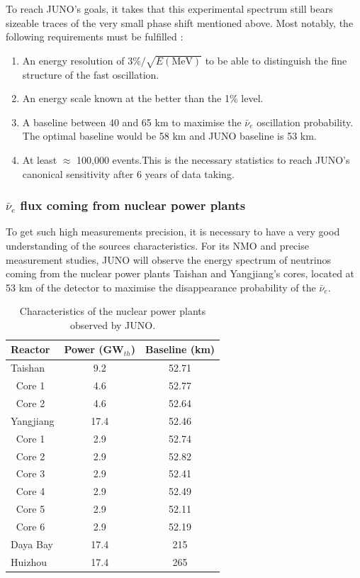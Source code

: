 \documentclass[../main.tex]{subfiles}
\begin{document}
To reach JUNO's goals, it takes that this experimental spectrum still bears sizeable traces of the very small phase shift mentioned above. Most notably, the
following requirements must be fulfilled :
\begin{enumerate}
  \item An energy resolution of $3\%/\sqrt{E\mathrm{(MeV)}}$ to be able to distinguish the fine structure of the fast oscillation.
  \item An energy scale known at the better than the 1\% level.
  \item A baseline between 40 and 65 km to maximise the $\bar{\nu}_e$ oscillation probability. The optimal baseline would be 58 km and JUNO baseline is 53 km.
  \item At least $\approx$ 100,000 events.This is the necessary statistics to reach JUNO's canonical sensitivity after 6 years of data taking.
\end{enumerate}

\subsubsection{$\bar{\nu}_e$ flux coming from nuclear power plants}
\label{sec:juno:nu_e_flux}

To get such high measurements precision, it is necessary to have a very good understanding of the sources characteristics. For its NMO and precise measurement studies, JUNO will observe the energy spectrum of neutrinos coming from the nuclear power plants Taishan and Yangjiang's cores, located at 53 km of the detector to maximise the disappearance probability of the $\bar{\nu}_e$.

\begin{table}[ht]
  \centering
  \begin{tabular}{l c c}
    \hline
    Reactor & Power (GW$_{th}$) & Baseline (km) \\
    \hline
    Taishan    & 9.2  & 52.71 \\
    $~$ Core 1 & 4.6  & 52.77 \\
    $~$ Core 2 & 4.6  & 52.64 \\
    Yangjiang  & 17.4 & 52.46 \\
    $~$ Core 1 & 2.9  & 52.74 \\
    $~$ Core 2 & 2.9  & 52.82 \\
    $~$ Core 3 & 2.9  & 52.41 \\
    $~$ Core 4 & 2.9  & 52.49 \\
    $~$ Core 5 & 2.9  & 52.11 \\
    $~$ Core 6 & 2.9  & 52.19 \\
    Daya Bay   & 17.4 & 215   \\
    Huizhou    & 17.4 & 265   \\
    \hline
  \end{tabular}
  \caption{Characteristics of the nuclear power plants observed by JUNO.}
  \label{tab:juno:power_plants}
\end{table}
\end{document}

